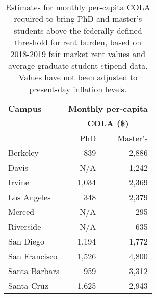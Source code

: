 \documentclass{article}
\begin{document}
\begin{table}[ht]
\centering
\begin{tabular}{@{}lrr@{}}
\toprule
\textbf{Campus} & \multicolumn{2}{c}{\textbf{Monthly per-capita }} \\ 
	        & \multicolumn{2}{c}{\textbf{ COLA (\$)}} \\ \midrule
                & PhD                       & Master’s                      \\
Berkeley        & 839                      & 2,886                          \\
Davis           & N/A                      & 1,242                          \\
Irvine          & 1,034                      & 2,369                          \\
Los Angeles     & 348                      & 2,379                          \\
Merced          & N/A                       & 295                           \\
Riverside       & N/A                       & 635                          \\
San Diego       & 1,194                      & 1,772                          \\
San Francisco   & 1,526                      & 4,800                          \\
Santa Barbara   & 959                      & 3,312                          \\
Santa Cruz      & 1,625                      & 2,943                          \\ \bottomrule
\end{tabular}
\caption{Estimates for monthly per-capita COLA required to bring PhD and master's students above the federally-defined threshold for rent burden, based on 2018-2019 fair market rent values and average graduate student stipend data. Values have not been adjusted to present-day inflation levels.}
\label{colamon}
\end{table}
\end{document}
